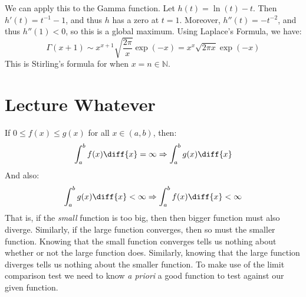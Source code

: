 \documentclass[crop=false,class=book,oneside]{standalone}
\begin{document}
        We can apply this to the Gamma function. Let
        $h(t)=\ln(t)-t$. Then $h'(t)=t^{\minus{1}}-1$, and thus $h$
        has a zero at $t=1$. Moreover, $h''(t)=\minus{t}^{\minus{2}}$,
        and thus $h''(1)<0$, so this is a global maximum.
        Using Laplace's Formula, we have:
        \begin{equation}
            \Gamma(x+1)\sim{x}^{x+1}
            \sqrt{\frac{2\pi}{x}}\exp(\minus{x})
            =x^{x}\sqrt{2\pi{x}}\exp(\minus{x})
        \end{equation}
        This is Stirling's formula for when $x=n\in\mathbb{N}$.
    \section{Lecture Whatever}
        If $0\leq{f}(x)\leq{g}(x)$ for all $x\in(a,b)$, then:
        \begin{equation}
            \int_{a}^{b}f(x)\diff{x}=\infty
            \Rightarrow\int_{a}^{b}g(x)\diff{x}
        \end{equation}
        And also:
        \begin{equation}
            \int_{a}^{b}g(x)\diff{x}<\infty
            \Rightarrow\int_{a}^{b}f(x)\diff{x}<\infty
        \end{equation}
        That is, if the \textit{small} function is too big,
        then then bigger function must also diverge. Similarly,
        if the large function converges, then so must the smaller
        function. Knowing that the small function converges tells
        us nothing about whether or not the large function does.
        Similarly, knowing that the large function diverges tells
        us nothing about the smaller function. To make use of the
        limit comparison test we need to know \textit{a priori} a
        good function to test against our given function.
\end{document}
